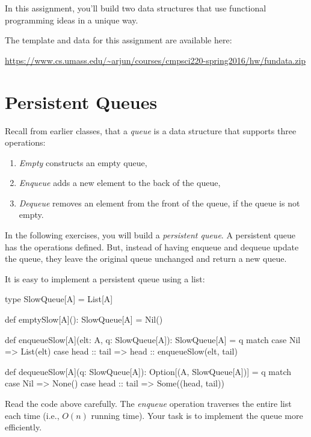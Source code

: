 \documentclass{book}
\begin{document}

In this assignment, you'll build two data structures that use functional
programming ideas in a unique way.

The template and data for this assignment are available here:

\url{https://www.cs.umass.edu/~arjun/courses/cmpsci220-spring2016/hw/fundata.zip}

\section{Persistent Queues}

Recall from earlier classes, that a \emph{queue} is a data structure that
supports three operations:

\begin{enumerate}

\item \emph{Empty} constructs an empty queue,

\item \emph{Enqueue} adds a new element to the back of the queue,

\item \emph{Dequeue} removes an element from the front of the queue, if the queue is
  not empty.

\end{enumerate}

In the following exercises, you will build a \emph{persistent queue}. A
persistent queue has the operations defined. But, instead of having enqueue and
dequeue update the queue, they leave the original queue unchanged and return a
new queue.

It is easy to implement a persistent queue using a list:

\begin{scalacode}
type SlowQueue[A] = List[A]

def emptySlow[A](): SlowQueue[A] = Nil()

def enqueueSlow[A](elt: A, q: SlowQueue[A]): SlowQueue[A] = q match {
  case Nil => List(elt)
  case head :: tail => head :: enqueueSlow(elt, tail)
}

def dequeueSlow[A](q: SlowQueue[A]): Option[(A, SlowQueue[A])] = q match {
  case Nil => None()
  case head :: tail => Some((head, tail))
}
\end{scalacode}

Read the code above carefully. The \emph{enqueue} operation traverses the
entire list each time (i.e., $O(n)$ running time). Your task is to implement
the queue more efficiently.
\end{document}
